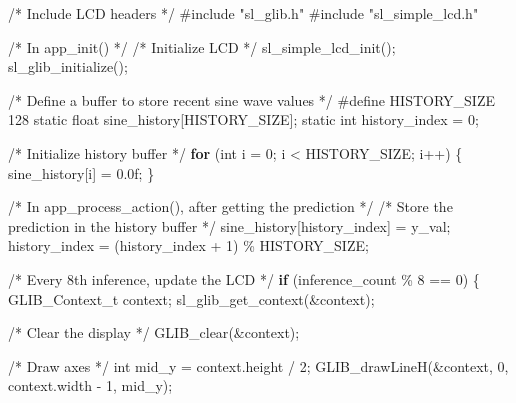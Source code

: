 \documentclass[
  9pt,
  letterpaper,
  abstract,
  titlepage]{scrbook}
\newenvironment{Shaded}{\begin{snugshade}}{\end{snugshade}}
\newcommand{\BuiltInTok}[1]{\textcolor[rgb]{0.00,0.23,0.31}{#1}}
\newcommand{\CommentTok}[1]{\textcolor[rgb]{0.37,0.37,0.37}{#1}}
\newcommand{\ControlFlowTok}[1]{\textcolor[rgb]{0.00,0.23,0.31}{\textbf{#1}}}
\newcommand{\DataTypeTok}[1]{\textcolor[rgb]{0.68,0.00,0.00}{#1}}
\newcommand{\DecValTok}[1]{\textcolor[rgb]{0.68,0.00,0.00}{#1}}
\newcommand{\FloatTok}[1]{\textcolor[rgb]{0.68,0.00,0.00}{#1}}
\newcommand{\ImportTok}[1]{\textcolor[rgb]{0.00,0.46,0.62}{#1}}
\newcommand{\NormalTok}[1]{\textcolor[rgb]{0.00,0.23,0.31}{#1}}
\newcommand{\OperatorTok}[1]{\textcolor[rgb]{0.37,0.37,0.37}{#1}}
\newcommand{\PreprocessorTok}[1]{\textcolor[rgb]{0.68,0.00,0.00}{#1}}
\begin{document}
\begin{Shaded}
\begin{Highlighting}[]
\CommentTok{/* Include LCD headers */}
\PreprocessorTok{\#include }\ImportTok{"sl\_glib.h"}
\PreprocessorTok{\#include }\ImportTok{"sl\_simple\_lcd.h"}

\CommentTok{/* In app\_init() */}
\CommentTok{/* Initialize LCD */}
\NormalTok{sl\_simple\_lcd\_init}\OperatorTok{();}
\NormalTok{sl\_glib\_initialize}\OperatorTok{();}

\CommentTok{/* Define a buffer to store recent sine wave values */}
\PreprocessorTok{\#define HISTORY\_SIZE }\DecValTok{128}
\DataTypeTok{static} \DataTypeTok{float}\NormalTok{ sine\_history}\OperatorTok{[}\NormalTok{HISTORY\_SIZE}\OperatorTok{];}
\DataTypeTok{static} \DataTypeTok{int}\NormalTok{ history\_index }\OperatorTok{=} \DecValTok{0}\OperatorTok{;}

\CommentTok{/* Initialize history buffer */}
\ControlFlowTok{for} \OperatorTok{(}\DataTypeTok{int}\NormalTok{ i }\OperatorTok{=} \DecValTok{0}\OperatorTok{;}\NormalTok{ i }\OperatorTok{\textless{}}\NormalTok{ HISTORY\_SIZE}\OperatorTok{;}\NormalTok{ i}\OperatorTok{++)} \OperatorTok{\{}
\NormalTok{  sine\_history}\OperatorTok{[}\NormalTok{i}\OperatorTok{]} \OperatorTok{=} \FloatTok{0.0}\BuiltInTok{f}\OperatorTok{;}
\OperatorTok{\}}

\CommentTok{/* In app\_process\_action(), after getting the prediction */}
\CommentTok{/* Store the prediction in the history buffer */}
\NormalTok{sine\_history}\OperatorTok{[}\NormalTok{history\_index}\OperatorTok{]} \OperatorTok{=}\NormalTok{ y\_val}\OperatorTok{;}
\NormalTok{history\_index }\OperatorTok{=} \OperatorTok{(}\NormalTok{history\_index }\OperatorTok{+} \DecValTok{1}\OperatorTok{)} \OperatorTok{\%}\NormalTok{ HISTORY\_SIZE}\OperatorTok{;}

\CommentTok{/* Every 8th inference, update the LCD */}
\ControlFlowTok{if} \OperatorTok{(}\NormalTok{inference\_count }\OperatorTok{\%} \DecValTok{8} \OperatorTok{==} \DecValTok{0}\OperatorTok{)} \OperatorTok{\{}
\NormalTok{  GLIB\_Context\_t context}\OperatorTok{;}
\NormalTok{  sl\_glib\_get\_context}\OperatorTok{(\&}\NormalTok{context}\OperatorTok{);}
  
  \CommentTok{/* Clear the display */}
\NormalTok{  GLIB\_clear}\OperatorTok{(\&}\NormalTok{context}\OperatorTok{);}
  
  \CommentTok{/* Draw axes */}
  \DataTypeTok{int}\NormalTok{ mid\_y }\OperatorTok{=}\NormalTok{ context}\OperatorTok{.}\NormalTok{height }\OperatorTok{/} \DecValTok{2}\OperatorTok{;}
\NormalTok{  GLIB\_drawLineH}\OperatorTok{(\&}\NormalTok{context}\OperatorTok{,} \DecValTok{0}\OperatorTok{,}\NormalTok{ context}\OperatorTok{.}\NormalTok{width }\OperatorTok{{-}} \DecValTok{1}\OperatorTok{,}\NormalTok{ mid\_y}\OperatorTok{);}
  

\end{Highlighting}
\end{Shaded}
\end{document}
